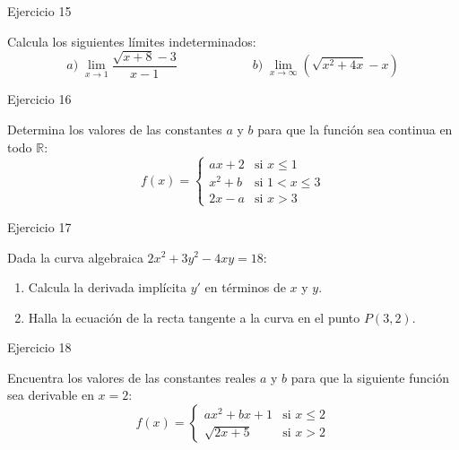 \documentclass[aspectratio=169]{beamer}
\begin{document}
\begin{frame}{Ejercicio 15}
  \begin{mwejercicio}
    Calcula los siguientes límites indeterminados:
    $$a)\; \lim_{x \to 1} \frac{\sqrt{x + 8} - 3}{x - 1} \qquad\qquad\qquad b)\; \lim_{x \to \infty} \left(\sqrt{x^2 + 4x} - x\right)$$
  \end{mwejercicio}
  \vspace{3.5cm}
\end{frame}
\begin{frame}{Ejercicio 16}
  \begin{mwejercicio}
    Determina los valores de las constantes $a$ y $b$ para que la función sea continua en todo $\mathbb{R}$:
    $$f(x) = \begin{cases}
      ax + 2 & \text{si } x \le 1 \\
      x^2 + b & \text{si } 1 < x \le 3 \\
      2x - a & \text{si } x > 3
    \end{cases}$$
  \end{mwejercicio}
  \vspace{3.5cm}
\end{frame}
\begin{frame}{Ejercicio 17}
  \begin{mwejercicio}
    Dada la curva algebraica $2x^2 + 3y^2 - 4xy = 18$:
    \begin{enumerate}
      \item Calcula la derivada implícita $y'$ en términos de $x$ y $y$.
      \item Halla la ecuación de la recta tangente a la curva en el punto $P(3, 2)$.
    \end{enumerate}
  \end{mwejercicio}
  \vspace{3.5cm}
\end{frame}
\begin{frame}{Ejercicio 18}
  \begin{mwejercicio}
    Encuentra los valores de las constantes reales $a$ y $b$ para que la siguiente función sea derivable en $x = 2$:
    $$f(x) = \begin{cases}
      ax^2 + bx + 1 & \text{si } x \le 2 \\
      \sqrt{2x + 5} & \text{si } x > 2
    \end{cases}$$
  \end{mwejercicio}
  \vspace{3.5cm}
\end{frame}
\end{document}
